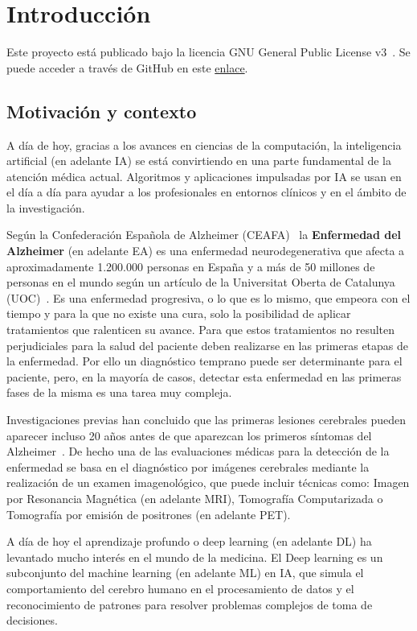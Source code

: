 \chapter{Introducción}\label{ch:introduccion}

Este proyecto está publicado bajo la licencia GNU General Public License v3~\cite{gplv3}.
Se puede acceder a través de GitHub en este \href{https://github.com/raquelmolinare/TFG}{enlace}.


\section{Motivación y contexto}\label{sec:motivacion-y-contexto}
A día de hoy, gracias a los avances en ciencias de la computación, la inteligencia artificial (en adelante IA) se está
convirtiendo en una parte fundamental de la atención médica actual.
Algoritmos y aplicaciones impulsadas por IA se usan en el día a día para ayudar a los profesionales en entornos clínicos
y en el ámbito de la investigación.

Según la Confederación Española de Alzheimer (CEAFA)~\cite{ceafa} la \textbf{Enfermedad del Alzheimer} (en adelante EA)
es una enfermedad neurodegenerativa que afecta a aproximadamente 1.200.000 personas en España y a más de 50 millones de
personas en el mundo según un artículo de la Universitat Oberta de Catalunya (UOC)~\cite{uoc}.
Es una enfermedad progresiva, o lo que es lo mismo, que empeora con el tiempo y para la que no existe una cura, solo
la posibilidad de aplicar tratamientos que ralenticen su avance.
Para que estos tratamientos no resulten perjudiciales para la salud del paciente deben realizarse en las primeras etapas
de la enfermedad.
Por ello un diagnóstico temprano puede ser determinante para el paciente, pero, en la mayoría de casos, detectar esta
enfermedad en las primeras fases de la misma es una tarea muy compleja.

Investigaciones previas han concluido que las primeras lesiones cerebrales pueden aparecer incluso 20 años antes de que
aparezcan los primeros síntomas del Alzheimer~\cite{ceafa}.
De hecho una de las evaluaciones médicas para la detección de la enfermedad se basa en el diagnóstico por imágenes
cerebrales mediante la realización de un examen imagenológico, que puede incluir técnicas como: Imagen por Resonancia
Magnética (en adelante MRI), Tomografía Computarizada o Tomografía por emisión de positrones (en adelante PET).

A día de hoy el aprendizaje profundo o deep learning (en adelante DL)  ha levantado mucho interés en el mundo de la
medicina.
El Deep learning es un subconjunto del machine learning (en adelante ML) en IA, que simula el comportamiento del cerebro
humano en el procesamiento de datos y el reconocimiento de patrones para resolver problemas complejos de toma de
decisiones.

